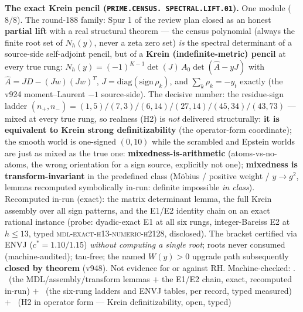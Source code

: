 \par\smallskip\noindent\textbf{The exact Krein pencil
(\texttt{PRIME.\allowbreak CENSUS.\allowbreak
SPECTRAL.\allowbreak LIFT.01}).}
One module ($8/8$).  The round-188 family: Spur 1 of the review
plan closed as an honest \textbf{partial lift} with a real
structural theorem --- the census polynomial (always the finite
root set of $N_h(y)$, never a zeta zero set) \emph{is} the
spectral determinant of a source-side self-adjoint pencil, but of
a \textbf{Krein (indefinite-metric) pencil} at every true rung:
$N_h(y) = (-1)^{K-1}\det(J)\,A_0\det(\hat A - yJ)$ with $\hat A =
JD - (Jw)(Jw)^T$, $J = \mathrm{diag}(\mathrm{sign}\,\rho_k)$, and
$\sum_k \rho_k = -y_t$ exactly (the v924 moment--Laurent $-1$
source-side).  The decisive number: the residue-sign ladder
$(n_+, n_-) = (1,5)/(7,3)/(6,14)/(27,14)/(45,34)/(43,73)$ ---
mixed at every true rung, so realness (H2) is \emph{not}
delivered structurally: \textbf{it is equivalent to Krein strong
definitizability} (the operator-form coordinate); the smooth
world is one-signed $(0,10)$ while the scrambled and Epstein
worlds are just as mixed as the true one:
\textbf{mixedness-is-arithmetic} (atoms-vs-no-atoms, the wrong
orientation for a sign source, explicitly not one);
\textbf{mixedness is transform-invariant} in the predefined class
(M\"obius / positive weight / $y \to g^2$, lemmas recomputed
symbolically in-run: definite impossible \emph{in class}).
Recomputed in-run (exact): the matrix determinant lemma, the full
Krein assembly over all sign patterns, and the E1/E2 identity
chain on an exact rational instance (probe: dyadic-exact E1 at
all six rungs, integer-Bareiss E2 at $h \le 13$, typed
\textsc{mdl-exact-h13-numeric-h2128}, disclosed).  The bracket
certified via ENVJ ($c^* = 1.10/1.15$) \emph{without computing a
single root}; roots never consumed (machine-audited); tau-free;
the named $W(y) > 0$ upgrade path subsequently \textbf{closed by
theorem} (v948).  Not evidence for or against RH.
Machine-checked: .
\mE\ (the MDL/assembly/transform lemmas $+$ the E1/E2 chain,
exact, recomputed in-run) $+$ \mC\ (the six-rung ladders and ENVJ
tables, per record, typed measured) $+$ \mO\ (H2 in operator form
--- Krein definitizability, open, typed)
\par\smallskip


